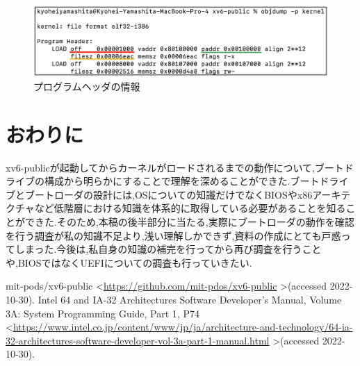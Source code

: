 \documentclass[submit,techreq,noauthor]{eco}	%
\begin{document}
\begin{figure}[H]
	\centering
	\includegraphics[scale=0.4]{fig/pic9.eps}
	\caption{プログラムヘッダの情報}
	\label{sample}
\end{figure}

\section{おわりに}
xv6-publicが起動してからカーネルがロードされるまでの動作について,ブートドライブの構成から明らかにすることで理解を深めることができた.ブートドライブとブートローダの設計には,OSについての知識だけでなくBIOSやx86アーキテクチャなど低階層における知識を体系的に取得している必要があることを知ることができた.そのため,本稿の後半部分に当たる,実際にブートローダの動作を確認を行う調査が私の知識不足より,浅い理解しかできず,資料の作成にとても戸惑ってしまった.今後は,私自身の知識の補完を行ってから再び調査を行うことや,BIOSではなくUEFIについての調査も行っていきたい.


\begin{thebibliography}{99}
	mit-pods/xv6-public
	\textless\url{https://github.com/mit-pdos/xv6-public}
	\textgreater (accessed 2022-10-30).
	Intel 64 and IA-32 Architectures Software Developer’s Manual, Volume 3A: System Programming Guide, Part 1, P74
	\textless\url{https://www.intel.co.jp/content/www/jp/ja/architecture-and-technology/64-ia-32-architectures-software-developer-vol-3a-part-1-manual.html}
	\textgreater (accessed 2022-10-30).
\end{thebibliography}
\end{document}
